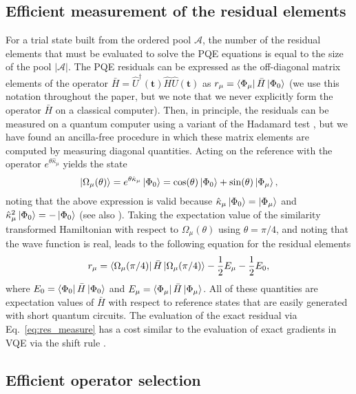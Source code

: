 \documentclass[aps,prx, reprint]{revtex4-2}
\begin{document}
\subsection{Efficient measurement of the residual elements}
For a trial state built from the ordered pool $\mathcal{A}$, the number of the residual elements that must be evaluated to solve the PQE equations is equal to the size of the pool $|\mathcal{A}|$.
The PQE residuals can be expressed as the off-diagonal matrix elements of the operator $\bar{H} = \hat{U}^\dagger(\mathbf{t}) \hat{H} \hat{U}(\mathbf{t})$ as $r_\mu = \bra{\Phi_\mu} \bar{H} \ket{\Phi_0}$ (we use this notation throughout the paper, but we note that we never explicitly form the operator $\bar{H}$ on a classical computer).
Then, in principle, the residuals can be measured on a quantum computer using a variant of the Hadamard test \cite{aharonov2009polynomial}, but we have found an ancilla-free procedure in which these matrix elements are computed by measuring diagonal quantities.
Acting on the reference with the operator $e^{\theta \hat{\kappa}_\mu}$ yields the state
\begin{equation}
\ket{\Omega_\mu(\theta)} = e^{\theta \hat{\kappa}_\mu} \ket{\Phi_0} = \cos(\theta) \ket{\Phi_0} + \sin(\theta) \ket{\Phi_\mu},
\end{equation}
noting that the above expression is valid because $\hat{\kappa}_\mu\ket{\Phi_0} = \ket{\Phi_\mu}$ and $\hat{\kappa}^2_\mu\ket{\Phi_0} = -\ket{\Phi_0}$ (see also \cite{Filip:2020ib,Chen:2021fa}).
Taking the expectation value of the similarity transformed Hamiltonian with respect to $\Omega_\mu(\theta)$ using $\theta = \pi / 4$, and noting that the wave function is real, leads to the following equation for the residual elements
\begin{equation}
r_\mu = \bra{\Omega_\mu(\pi/4)} \bar{H} \ket{\Omega_\mu(\pi/4)}
- \frac{1}{2}E_\mu
- \frac{1}{2}E_0,
\label{eq:res_measure}
\end{equation}
where $E_0 = \bra{\Phi_0} \bar{H} \ket{\Phi_0}$ and $E_\mu = \bra{\Phi_\mu} \bar{H} \ket{\Phi_\mu}$.
All of these quantities are expectation values of $\bar{H}$ with respect to reference states that are easily generated with short quantum circuits.
The evaluation of the exact residual via Eq.~\eqref{eq:res_measure} has a cost similar to the evaluation of exact gradients in VQE via the shift rule \cite{schuld2019evaluating, kottmann2020feasible}.

\subsection{Efficient operator selection}
\label{sec:selection}
\end{document}
